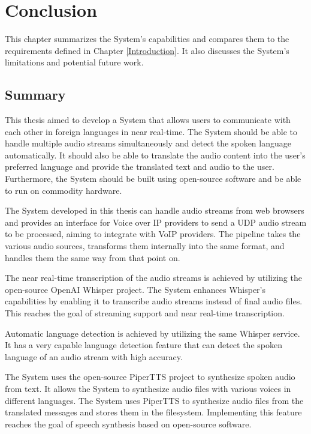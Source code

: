 \chapter{Conclusion}

\label{Conclusion}

This chapter summarizes the System's capabilities and compares them to the requirements defined in Chapter 
\ref{Introduction}. It also discusses the System's limitations and potential future work.


\section{Summary}

This thesis aimed to develop a System that allows users to communicate with each other in foreign languages in near 
real-time. The System should be able to handle multiple audio streams simultaneously and detect the spoken language 
automatically. It should also be able to translate the audio content into the user's preferred language and provide the 
translated text and audio to the user. Furthermore, the System should be built using open-source software and be able 
to run on commodity hardware.

The System developed in this thesis can handle audio streams from web browsers and provides an interface for Voice over 
IP providers to send a UDP audio stream to be processed, aiming to integrate with VoIP providers. The pipeline takes 
the various audio sources, transforms them internally into the same format, and handles them the same way from that 
point on.

The near real-time transcription of the audio streams is achieved by utilizing the open-source OpenAI Whisper project. 
The System enhances Whisper's capabilities by enabling it to transcribe audio streams instead of final audio files. 
This reaches the goal of streaming support and near real-time transcription.

Automatic language detection is achieved by utilizing the same Whisper service. It has a very capable language 
detection feature that can detect the spoken language of an audio stream with high accuracy.

The System uses the open-source PiperTTS project to synthesize spoken audio from text. It allows the System to 
synthesize audio files with various voices in different languages. The System uses PiperTTS to synthesize audio files 
from the translated messages and stores them in the filesystem. Implementing this feature reaches the goal of speech 
synthesis based on open-source software.

